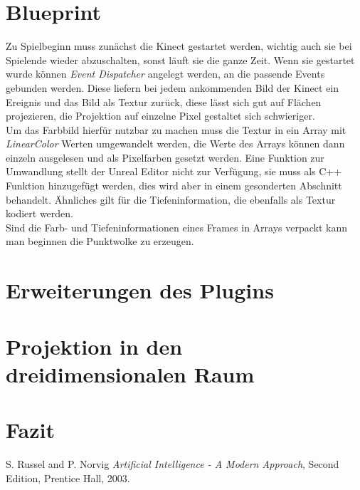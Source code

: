 \documentclass[cover]{isas-seminar}
\begin{document}
\section{Blueprint}
Zu Spielbeginn muss zunächst die Kinect gestartet werden, wichtig auch sie bei Spielende wieder abzuschalten, sonst läuft sie die ganze Zeit. Wenn sie gestartet wurde können \textit{Event Dispatcher} angelegt werden, an die passende Events gebunden werden. Diese liefern bei jedem ankommenden Bild der Kinect ein Ereignis und das Bild als Textur zurück, diese lässt sich gut auf Flächen projezieren, die Projektion auf einzelne Pixel gestaltet sich schwieriger. \\
Um das Farbbild hierfür nutzbar zu machen muss die Textur in ein Array mit \textit{LinearColor} Werten umgewandelt werden, die Werte des Arrays können dann einzeln ausgelesen und als Pixelfarben gesetzt werden. Eine Funktion zur Umwandlung stellt der Unreal Editor nicht zur Verfügung, sie muss als C++ Funktion hinzugefügt werden, dies wird aber in einem gesonderten Abschnitt behandelt. Ähnliches gilt für die Tiefeninformation, die ebenfalls als Textur kodiert werden. \\
Sind die Farb- und Tiefeninformationen eines Frames in Arrays verpackt kann man beginnen die Punktwolke zu erzeugen.

\section{Erweiterungen des Plugins}

\section{Projektion in den dreidimensionalen Raum}

\section{Fazit}
%

%

\newpage 


\begin{thebibliography}{99}

 {\sc S. Russel and P. Norvig }  \textit{Artificial Intelligence - A Modern Approach},
Second Edition, Prentice Hall, 2003.

\end{thebibliography}
\end{document}
